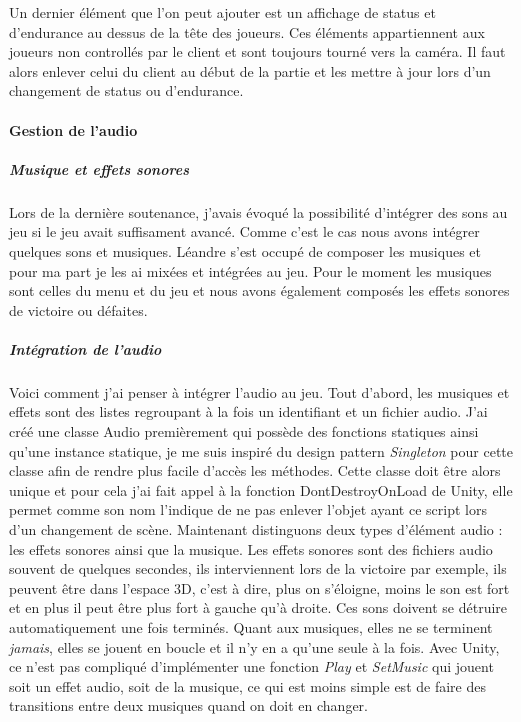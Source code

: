 \documentclass{article}
\begin{document}
Un dernier élément que l'on peut ajouter est un affichage de status et d'endurance au dessus de la tête des joueurs. Ces éléments appartiennent aux joueurs non controllés par le client et sont toujours tourné vers la caméra. Il faut alors enlever celui du client au début de la partie et les mettre à jour lors d'un changement de status ou d'endurance.

\paragraph{Gestion de l'audio}

\subparagraph{Musique et effets sonores}

Lors de la dernière soutenance, j'avais évoqué la possibilité d'intégrer des sons au jeu si le jeu avait suffisament avancé. Comme c'est le cas nous avons intégrer quelques sons et musiques. Léandre s'est occupé de composer les musiques et pour ma part je les ai mixées et intégrées au jeu. Pour le moment les musiques sont celles du menu et du jeu et nous avons également composés les effets sonores de victoire ou défaites.

\subparagraph{Intégration de l'audio}

Voici comment j'ai penser à intégrer l'audio au jeu.
Tout d'abord, les musiques et effets sont des listes regroupant à la fois un identifiant et un fichier audio.
J'ai créé une classe Audio premièrement qui possède des fonctions statiques ainsi qu'une instance statique, je me suis inspiré du design pattern \emph{Singleton} pour cette classe afin de rendre plus facile d'accès les méthodes. Cette classe doit être alors unique et pour cela j'ai fait appel à la fonction DontDestroyOnLoad de Unity, elle permet comme son nom l'indique de ne pas enlever l'objet ayant ce script lors d'un changement de scène. Maintenant distinguons deux types d'élément audio : les effets sonores ainsi que la musique. Les effets sonores sont des fichiers audio souvent de quelques secondes, ils interviennent lors de la victoire par exemple, ils peuvent être dans l'espace 3D, c'est à dire, plus on s'éloigne, moins le son est fort et en plus il peut être plus fort à gauche qu'à droite. Ces sons doivent se détruire automatiquement une fois terminés. Quant aux musiques, elles ne se terminent \emph{jamais}, elles se jouent en boucle et il n'y en a qu'une seule à la fois. Avec Unity, ce n'est pas compliqué d'implémenter une fonction \emph{Play} et \emph{SetMusic} qui jouent soit un effet audio, soit de la musique, ce qui est moins simple est de faire des transitions entre deux musiques quand on doit en changer.
\end{document}
